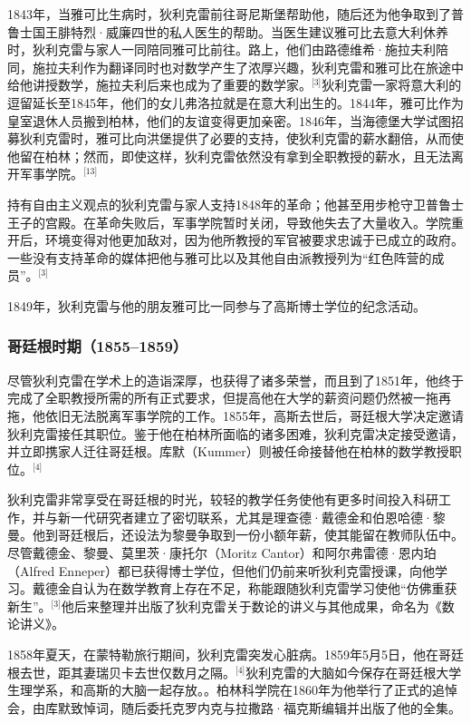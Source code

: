 1843年，当雅可比生病时，狄利克雷前往哥尼斯堡帮助他，随后还为他争取到了普鲁士国王腓特烈·威廉四世的私人医生的帮助。当医生建议雅可比去意大利休养时，狄利克雷与家人一同陪同雅可比前往。路上，他们由路德维希·施拉夫利陪同，施拉夫利作为翻译同时也对数学产生了浓厚兴趣，狄利克雷和雅可比在旅途中给他讲授数学，施拉夫利后来也成为了重要的数学家。\(^\text{[3]}\)狄利克雷一家将意大利的逗留延长至1845年，他们的女儿弗洛拉就是在意大利出生的。1844年，雅可比作为皇室退休人员搬到柏林，他们的友谊变得更加亲密。1846年，当海德堡大学试图招募狄利克雷时，雅可比向洪堡提供了必要的支持，使狄利克雷的薪水翻倍，从而使他留在柏林；然而，即使这样，狄利克雷依然没有拿到全职教授的薪水，且无法离开军事学院。\(^\text{[13]}\)

持有自由主义观点的狄利克雷与家人支持1848年的革命；他甚至用步枪守卫普鲁士王子的宫殿。在革命失败后，军事学院暂时关闭，导致他失去了大量收入。学院重开后，环境变得对他更加敌对，因为他所教授的军官被要求忠诚于已成立的政府。一些没有支持革命的媒体把他与雅可比以及其他自由派教授列为“红色阵营的成员”。\(^\text{[3]}\)

1849年，狄利克雷与他的朋友雅可比一同参与了高斯博士学位的纪念活动。
\subsubsection{哥廷根时期（1855–1859）}
尽管狄利克雷在学术上的造诣深厚，也获得了诸多荣誉，而且到了1851年，他终于完成了全职教授所需的所有正式要求，但提高他在大学的薪资问题仍然被一拖再拖，他依旧无法脱离军事学院的工作。1855年，高斯去世后，哥廷根大学决定邀请狄利克雷接任其职位。鉴于他在柏林所面临的诸多困难，狄利克雷决定接受邀请，并立即携家人迁往哥廷根。库默（Kummer）则被任命接替他在柏林的数学教授职位。\(^\text{[4]}\)

狄利克雷非常享受在哥廷根的时光，较轻的教学任务使他有更多时间投入科研工作，并与新一代研究者建立了密切联系，尤其是理查德·戴德金和伯恩哈德·黎曼。他到哥廷根后，还设法为黎曼争取到一份小额年薪，使其能留在教师队伍中。尽管戴德金、黎曼、莫里茨·康托尔（Moritz Cantor）和阿尔弗雷德·恩内珀（Alfred Enneper）都已获得博士学位，但他们仍前来听狄利克雷授课，向他学习。戴德金自认为在数学教育上存在不足，称能跟随狄利克雷学习使他“仿佛重获新生”。\(^\text{[3]}\)他后来整理并出版了狄利克雷关于数论的讲义与其他成果，命名为《数论讲义》。

1858年夏天，在蒙特勒旅行期间，狄利克雷突发心脏病。1859年5月5日，他在哥廷根去世，距其妻瑞贝卡去世仅数月之隔。\(^\text{[4]}\)狄利克雷的大脑如今保存在哥廷根大学生理学系，和高斯的大脑一起存放。。柏林科学院在1860年为他举行了正式的追悼会，由库默致悼词，随后委托克罗内克与拉撒路·福克斯编辑并出版了他的全集。
